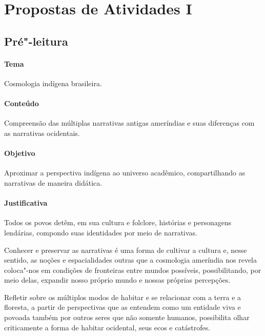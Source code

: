 \documentclass[12pt]{extarticle}
\begin{document}
\tableofcontents


\section{Propostas de Atividades I}

\subsection{Pré"-leitura}

\paragraph{Tema} Cosmologia indígena brasileira.

\paragraph{Conteúdo} Compreensão das múltiplas narrativas antigas ameríndias
e suas diferenças com as narrativas ocidentais. 

\paragraph{Objetivo} Aproximar a perspectiva indígena ao universo acadêmico, 
compartilhando as narrativas de maneira didática.


\paragraph{Justificativa} Todos os povos detêm, em sua cultura e folclore,
histórias e personagens lendárias, compondo suas identidades por meio de
narrativas. 

Conhecer e preservar as narrativas é uma forma de
cultivar a cultura e, nesse sentido, as noções e espacialidades outras 
que a cosmologia ameríndia nos revela coloca"-nos em condições de fronteiras 
entre mundos possíveis, possibilitando, por meio delas, expandir nosso 
próprio mundo e nossas próprias percepções.

Refletir sobre os múltiplos modos de habitar e se relacionar com a terra e 
a floresta, a partir de perspectivas que as entendem como um entidade
viva e povoada também por outros seres que não somente humanos, possibilita
olhar criticamente a forma de habitar ocidental, seus ecos e catástrofes.
\end{document}
